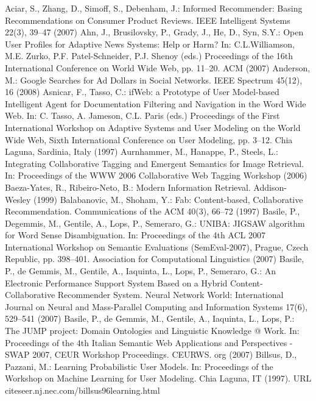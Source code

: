 \begin{thebibliography}{110}
Aciar, S., Zhang, D., Simoff, S., Debenham, J.: Informed Recommender: Basing Recommendations on Consumer Product Reviews. IEEE Intelligent Systems 22(3), 39–47 (2007)
Ahn, J., Brusilovsky, P., Grady, J., He, D., Syn, S.Y.: Open User Profiles for Adaptive News Systems: Help or Harm? In: C.L.Williamson, M.E. Zurko, P.F. Patel-Schneider, P.J. Shenoy (eds.) Proceedings of the 16th International Conference on World Wide Web, pp. 11–20. ACM (2007)
Anderson, M.: Google Searches for Ad Dollars in Social Networks. IEEE Spectrum 45(12), 16 (2008)
Asnicar, F., Tasso, C.: ifWeb: a Prototype of User Model-based Intelligent Agent for Documentation Filtering and Navigation in the Word Wide Web. In: C. Tasso, A. Jameson, C.L. Paris (eds.) Proceedings of the First International Workshop on Adaptive Systems and User Modeling on the World Wide Web, Sixth International Conference on User Modeling, pp. 3–12. Chia Laguna, Sardinia, Italy (1997)
Aurnhammer, M., Hanappe, P., Steels, L.: Integrating Collaborative Tagging and Emergent Semantics for Image Retrieval. In: Proceedings of the WWW 2006 Collaborative Web Tagging Workshop (2006)
Baeza-Yates, R., Ribeiro-Neto, B.: Modern Information Retrieval. Addison-Wesley (1999)
Balabanovic, M., Shoham, Y.: Fab: Content-based, Collaborative Recommendation. Communications of the ACM 40(3), 66–72 (1997)
Basile, P., Degemmis, M., Gentile, A., Lops, P., Semeraro, G.: UNIBA: JIGSAW algorithm for Word Sense Disambiguation. In: Proceedings of the 4th ACL 2007 International Workshop on Semantic Evaluations (SemEval-2007), Prague, Czech Republic, pp. 398–401. Association for Computational Linguistics (2007)
Basile, P., de Gemmis, M., Gentile, A., Iaquinta, L., Lops, P., Semeraro, G.: An Electronic Performance Support System Based on a Hybrid Content-Collaborative Recommender System. Neural Network World: International Journal on Neural and Mass-Parallel Computing and Information Systems 17(6), 529–541 (2007)
Basile, P., de Gemmis, M., Gentile, A., Iaquinta, L., Lops, P.: The JUMP project: Domain Ontologies and Linguistic Knowledge @ Work. In: Proceedings of the 4th Italian Semantic Web Applications and Perspectives - SWAP 2007, CEUR Workshop Proceedings. CEURWS. org (2007)
Billsus, D., Pazzani, M.: Learning Probabilistic User Models. In: Proceedings of the Workshop on Machine Learning for User Modeling. Chia Laguna, IT (1997). URL citeseer.nj.nec.com/billsus96learning.html

\end{thebibliography}

